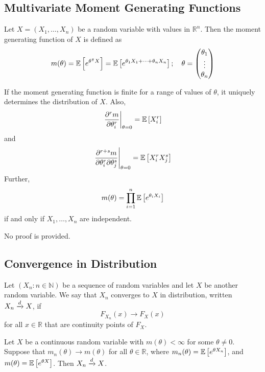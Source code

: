 \subsection{Multivariate Moment Generating Functions}
Let \(X = (X_1, \dots, X_n)\) be a random variable with values in \(\mathbb R^n\).
Then the moment generating function of \(X\) is defined as
\[
	m(\theta) = \mathbb{E}\left[{e^{\theta^\intercal X}}\right] = \mathbb{E}\left[{e^{\theta_1 X_1 + \dots + \theta_n X_n}}\right];\quad \theta = \begin{pmatrix}
		\theta_1 \\ \vdots \\ \theta_n
	\end{pmatrix}
\]
\begin{theorem}
	If the moment generating function is finite for a range of values of \(\theta\), it uniquely determines the distribution of \(X\).
	Also,
	\[
		\eval{\pdv[r]{m}{\theta_i}}_{\theta = 0} = \expect{X_i^r}
	\]
	and
	\[
		\eval{\frac{\partial^{r+s}m}{\partial \theta_i^r \partial \theta_j^s}}_{\theta = 0} = \expect{X_i^r X_j^s}
	\]
	Further,
	\[
		m(\theta) = \prod_{i = 1}^n \mathbb{E}\left[{e^{\theta_i X_i}}\right]
	\]
	if and only if \(X_1, \dots, X_n\) are independent.
\end{theorem}
\noindent No proof is provided.

\subsection{Convergence in Distribution}
\begin{definition}
	Let \((X_n \colon n \in \mathbb N)\) be a sequence of random variables and let \(X\) be another random variable.
	We say that \(X_n\) converges to \(X\) in distribution, written \(X_n \xrightarrow{d} X\), if
	\[
		F_{X_n}(x) \to F_X(x)
	\]
	for all \(x \in \mathbb R\) that are continuity points of \(F_X\).
\end{definition}
\begin{theorem}
	Let \(X\) be a continuous random variable with \(m(\theta) < \infty\) for some \(\theta \neq 0\).
	Suppose that \(m_n(\theta) \to m(\theta)\) for all \(\theta \in \mathbb R\), where \(m_n(\theta) = \mathbb{E}\left[{e^{\theta X_n}}\right]\), and \(m(\theta) = \mathbb{E}\left[{e^{\theta X}}\right]\).
	Then \(X_n \xrightarrow{d} X\).
\end{theorem}


